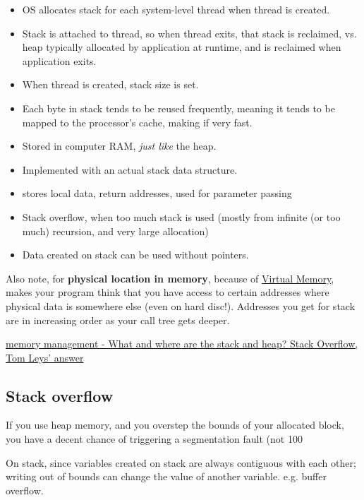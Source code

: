 \documentclass[10pt]{amsart}
\begin{document}
\begin{multicols*}{2}
\begin{itemize}
	\item OS allocates stack for each system-level thread when thread is created.  
	\item Stack is attached to thread, so when thread exits, that stack is reclaimed, vs. heap typically allocated by application at runtime, and is reclaimed when application exits.  
	\item When thread is created, stack size is set.  
	\item Each byte in stack tends to be reused frequently, meaning it tends to be mapped to the processor's cache, making if very fast.  
	\item Stored in computer RAM, \emph{just like} the heap.  
	\item Implemented with an actual stack data structure.  
	\item stores local data, return addresses, used for parameter passing  
	\item Stack overflow, when too much stack is used (mostly from infinite (or too much) recursion, and very large allocation)
	\item Data created on stack can be used without pointers.  
\end{itemize}

Also note, for \textbf{physical location in memory}, because of \href{http://en.wikipedia.org/wiki/Virtual_memory}{Virtual Memory}, makes your program think that you have access to certain addresses where physical data is somewhere else (even on hard disc!).  Addresses you get for stack are in increasing order as your call tree gets deeper.  

\href{http://stackoverflow.com/questions/79923/what-and-where-are-the-stack-and-heap/79988#79988}{memory management - What and where are the stack and heap? Stack Overflow, Tom Leys' answer}

\subsection{Stack overflow}  

If you use heap memory, and you overstep the bounds of your allocated block, you have a decent chance of triggering a segmentation fault (not 100%

On stack, since variables created on stack are always contiguous with each other; writing out of bounds can change the value of another variable.  e.g. buffer overflow.  




\end{multicols*}
\end{document}
